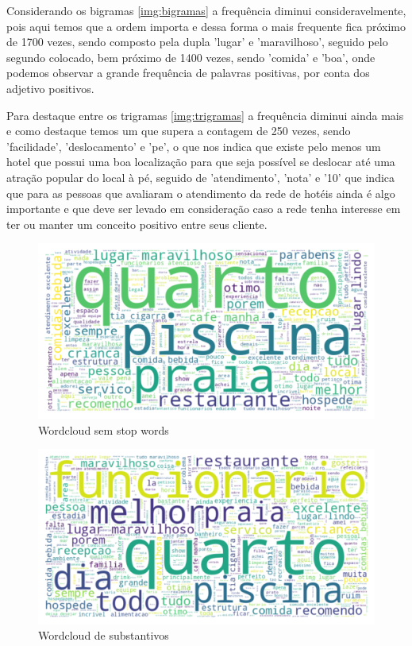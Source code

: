 Considerando os bigramas \ref{img:bigramas} a frequência diminui consideravelmente, pois aqui temos que a ordem importa e dessa forma o mais frequente fica próximo de 1700 vezes, sendo composto pela dupla 'lugar' e 'maravilhoso', seguido pelo segundo colocado, bem próximo de 1400 vezes, sendo 'comida' e 'boa', onde podemos observar a grande frequência de palavras positivas, por conta dos adjetivo positivos.

Para destaque entre os trigramas \ref{img:trigramas} a frequência diminui ainda mais e como destaque temos um que supera a contagem de 250 vezes, sendo 'facilidade', 'deslocamento' e 'pe', o que nos indica que existe pelo menos um hotel que possui uma boa localização para que seja possível se deslocar até uma atração popular do local à pé, seguido de 'atendimento', 'nota' e '10' que indica que para as pessoas que avaliaram o atendimento da rede de hotéis ainda é algo importante e que deve ser levado em consideração caso a rede tenha interesse em ter ou manter um conceito positivo entre seus cliente.


\begin{figure}
	\centering
	\includegraphics[width=1\textwidth]{figs/exploratoria/wordcloud_geral.png}
	\caption{Wordcloud sem stop words}
	\label{img:wordcloud_geral}
\end{figure}


\begin{figure}
	\centering
	\includegraphics[width=1\textwidth]{figs/exploratoria/wordcloud_substantivos.png}
	\caption{Wordcloud de substantivos}
	\label{img:wordcloud_substantivos}
\end{figure}


